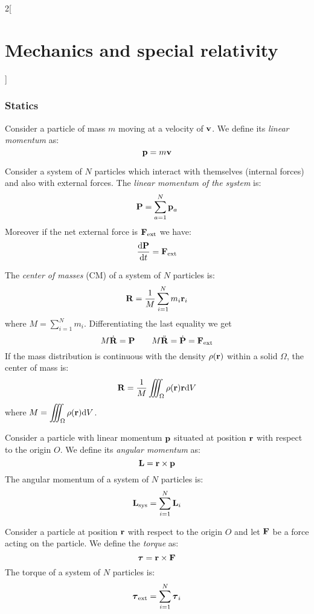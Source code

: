 \documentclass[../../../main.tex]{subfiles}
\begin{document}
\begin{multicols}{2}[\section{Mechanics and special relativity}]
    \subsubsection*{Statics}
    \begin{definition}
        Consider a particle of mass $m$ moving at a velocity of $\boldsymbol{\mathrm{v}}$. We define its \textit{linear momentum} as:
        $$\boldsymbol{\mathrm{p}}=m\boldsymbol{\mathrm{v}}$$
    \end{definition}
    \begin{prop}
        Consider a system of $N$ particles which interact with themselves (internal forces) and also with external forces. The \textit{linear momentum of the system} is: $$\boldsymbol{\mathrm{P}}=\sum_{a=1}^N\boldsymbol{\mathrm{p}}_a$$ Moreover if the net external force is $\boldsymbol{\mathrm{F}}_\text{ext}$ we have:
        $$\dv{\boldsymbol{\mathrm{P}}}{t}=\boldsymbol{\mathrm{F}}_\text{ext}$$
    \end{prop}
    \begin{prop}
        The \textit{center of masses} (CM) of a system of $N$ particles is: $$\boldsymbol{\mathrm{R}}=\frac{1}{M}\sum_{i=1}^Nm_i\boldsymbol{\mathrm{r}}_i$$ where $\displaystyle M=\sum_{i=1}^Nm_i$. Differentiating the last equality we get
        $$M\dot{\boldsymbol{\mathrm{R}}}=\boldsymbol{\mathrm{P}}\qquad M\ddot{\boldsymbol{\mathrm{R}}}=\dot{\boldsymbol{\mathrm{P}}}=\boldsymbol{\mathrm{F}}_\text{ext}$$
        If the mass distribution is continuous with the density $\rho(\boldsymbol{\mathrm{r}})$ within a solid $\Omega$, the center of mass is: $$\boldsymbol{\mathrm{R}}=\frac{1}{M}\iiint_\Omega\rho(\boldsymbol{\mathrm{r}})\boldsymbol{\mathrm{r}}\dd V$$ where $\displaystyle M=\iiint_\Omega\rho(\boldsymbol{\mathrm{r}})\dd V$.
    \end{prop}
    \begin{prop}
        Consider a particle with linear momentum $\boldsymbol{\mathrm{p}}$ situated at position $\boldsymbol{\mathrm{r}}$ with respect to the origin $O$. We define its \textit{angular momentum} as: $$\boldsymbol{\mathrm{L}}=\boldsymbol{\mathrm{r}}\times\boldsymbol{\mathrm{p}}$$ The angular momentum of a system of $N$ particles is: $$\boldsymbol{\mathrm{L}}_\text{sys}=\sum_{i=1}^N\boldsymbol{\mathrm{L}}_i$$
    \end{prop}
    \begin{prop}[Torque]
        Consider a particle at position $\boldsymbol{\mathrm{r}}$ with respect to the origin $O$ and let $\boldsymbol{\mathrm{F}}$ be a force acting on the particle. We define the \textit{torque} as: $$\vb*{\tau}=\boldsymbol{\mathrm{r}}\times\boldsymbol{\mathrm{F}}$$ The torque of a system of $N$ particles is: $$\vb*{\tau}_\text{ext}=\sum_{i=1}^N\vb*{\tau}_i$$

\end{prop}
\end{multicols}
\end{document}
